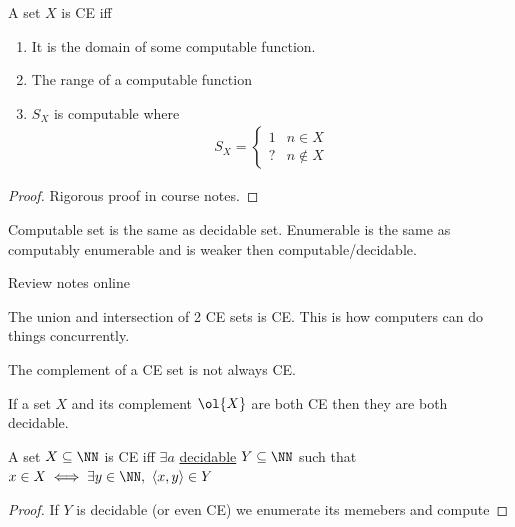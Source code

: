 \documentclass[../598comp.tex]{subfiles}
\begin{document}
\begin{theorem}
  A set $X$ is CE iff
  \begin{enumerate}
  \item 
    It is the domain of some computable function.
  \item
    The range of a computable function
  \item
    $S_X$ is computable where
    \begin{gather*}
      S_X =
      \begin{cases}
        1 &n \in X \\
        ? &n \notin X
      \end{cases}
    \end{gather*}
  \end{enumerate}
  \begin{proof}
    Rigorous proof in course notes.
  \end{proof}
\end{theorem}

\begin{note}
  Computable set is the same as decidable set. Enumerable is the same as
  computably enumerable and is weaker then computable/decidable.
\end{note}

Review notes online

\begin{theorem}
  The union and intersection of 2 CE sets is CE. This is how computers can do
  things concurrently.
\end{theorem}

\begin{remark}
  The complement of a CE set is not always CE. %
\end{remark}

\begin{proposition}
  If a set $X$ and its complement $\ol{X}$ are both CE then they are both decidable.
\end{proposition}

\begin{theorem}
  A set $X \subseteq \NN$ is CE iff $\exists a$ \ul{decidable} $Y \subseteq \NN$
  such that $x \in X \iff \exists y \in \NN, \ \langle x, y \rangle \in Y$
  \begin{proof}
    If $Y$ is decidable (or even CE) we enumerate its memebers and compute
  \end{proof}
\end{theorem}
\end{document}
